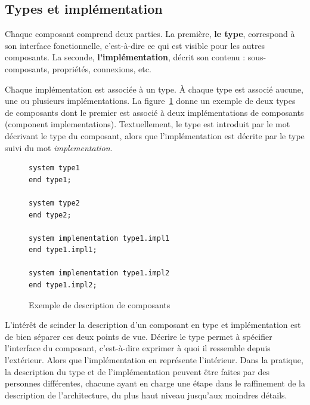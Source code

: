 \documentclass[11pt,a4paper]{paper}
\begin{document}
\begin{appendices}
\subsection{Types et implémentation}

Chaque composant comprend deux parties. La première, \textbf{le type}, correspond à son interface fonctionnelle, c'est-à-dire ce qui est visible pour les autres composants. La seconde, \textbf{l'implémentation}, décrit son contenu : sous-composants, propriétés, connexions, etc.

Chaque implémentation est associée à un type. À chaque type est associé aucune, une ou plusieurs implémentations. La figure~\ref{fig:type_implementation} donne un exemple de deux types de composants dont le premier est associé à deux implémentations de composants (component implementations).  Textuellement, le type est introduit par le mot décrivant le type du composant, alors que l'implémentation est décrite par le type suivi du mot {\em implementation}.


\begin{figure}[htbp]
\begin{center}
\begin{minipage}[c]{.46\linewidth}
\begin{lstlisting}
system type1
end type1;

system type2
end type2;

system implementation type1.impl1
end type1.impl1;

system implementation type1.impl2
end type1.impl2;
\end{lstlisting}
\end{minipage}
\caption{Exemple de description de composants}
\label{fig:type_implementation}
\end{center}
\end{figure}

L'intérêt de scinder la description d'un composant en type et implémentation est de bien séparer ces deux points de vue. Décrire le type permet à spécifier l'interface du composant, c'est-à-dire exprimer à quoi il ressemble depuis l'extérieur. Alors que l'implémentation en représente l'intérieur. Dans la pratique, la description du type et de l'implémentation peuvent être faites par des personnes différentes, chacune ayant en charge une étape dans le raffinement de la description de l'architecture, du plus haut niveau jusqu'aux moindres détails.



\end{appendices}
\end{document}
